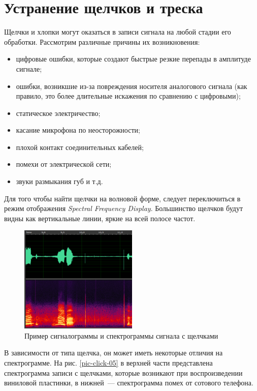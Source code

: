 \documentclass[oneside, final, 14pt]{extreport}
\begin{document}
\section{Устранение щелчков и треска}
Щелчки и хлопки могут оказаться в записи сигнала на любой стадии его обработки. Рассмотрим различные причины их возникновения:
\begin{itemize}
  \item цифровые ошибки, которые создают быстрые резкие перепады в амплитуде сигнале;
  \item ошибки, возникшие из-за повреждения носителя аналогового сигнала (как правило, это более длительные искажения по сравнению с цифровыми);
  \item статическое электричество;
  \item касание микрофона по неосторожности;
  \item плохой контакт соединительных кабелей;
  \item помехи от электрической сети;
  \item звуки размыкания губ и т.д.
\end{itemize}

Для того чтобы найти щелчки на волновой форме, следует переключиться в режим отображения \textit{Spectral Frequency Display}. Большинство щелчков будут видны как вертикальные линии, яркие на всей полосе частот.

\begin{figure}[h]
\centering
\includegraphics[width=0.5\textwidth]{pic-click-01}
\caption{Пример сигналограммы и спектрограммы сигнала с щелчками}
\label{pic-click-01}
\end{figure}

В зависимости от типа щелчка, он может иметь некоторые отличия на спектрограмме. На рис. \ref{pic-click-05} в верхней части представлена спектрограмма записи с щелчками, которые возникают при воспроизведении виниловой пластинки, в нижней~--- спектрограмма помех от сотового телефона.
\end{document}
